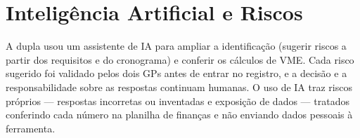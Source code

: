 \documentclass[11pt,a4paper]{article}
\begin{document}
\section{Inteligência Artificial e Riscos}
A dupla usou um assistente de IA para ampliar a identificação (sugerir riscos a partir dos requisitos e do cronograma) e conferir os cálculos de VME. Cada risco sugerido foi validado pelos dois GPs antes de entrar no registro, e a decisão e a responsabilidade sobre as respostas continuam humanas. O uso de IA traz riscos próprios --- respostas incorretas ou inventadas e exposição de dados --- tratados conferindo cada número na planilha de finanças e não enviando dados pessoais à ferramenta.
\end{document}
